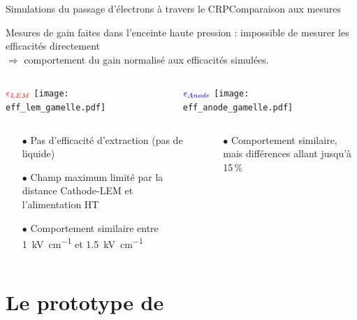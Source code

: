     \begin{frame}{Simulations du passage d'électrons à travers le CRP}{Comparaison aux mesures}
        \begin{scriptsize}
            Mesures de gain faites dans l'enceinte haute pression : impossible de mesurer les efficacités directement \\$\Rightarrow$ comportement du gain normalisé aux efficacités simulées.
        \begin{columns}
            \begin{column}{0.5\textwidth}
                \centering $\textcolor{red}{\epsilon_{LEM}}$
                \texttt{[image: eff\_lem\_gamelle.pdf]}
            \end{column}\hfill
            \begin{column}{0.5\textwidth}
                \centering $\textcolor{blue}{\epsilon_{Anode}}$
                \texttt{[image: eff\_anode\_gamelle.pdf]}
            \end{column}
        \end{columns}
   		\begin{columns}
            \begin{column}{0.5\textwidth}
                \begin{itemize}
                    \item[$\bullet$] Pas d'efficacité d'extraction (pas de liquide)
                    \item[$\bullet$] Champ maximum limité par la distance Cathode-LEM et l'alimentation HT
                    \item[$\bullet$] Comportement similaire entre \SI{1}{\kilo\volt\per\centi\meter} et \SI{1.5}{\kilo\volt\per\centi\meter}
                \end{itemize}
            \end{column}\hfill
            \begin{column}{0.5\textwidth}
                \begin{itemize}
                    \item[$\bullet$] Comportement similaire, mais différences allant jusqu'à 15\,\%
                \end{itemize}
            \end{column}
        \end{columns}
        \end{scriptsize}
    \end{frame}


    \section{Le prototype de \TOO{}}
